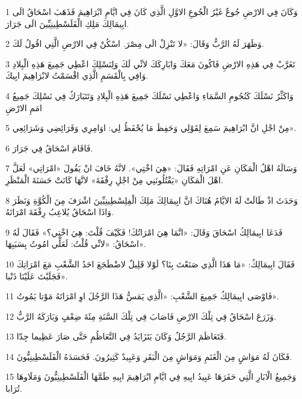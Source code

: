 \par 1 وَكَانَ فِي الارْضِ جُوعٌ غَيْرُ الْجُوعِ الاوَّلِ الَّذِي كَانَ فِي ايَّامِ ابْرَاهِيمَ فَذَهَبَ اسْحَاقُ الَى ابِيمَالِكَ مَلِكِ الْفَلَسْطِينِيِّينَ الَى جَرَارَ.
\par 2 وَظَهَرَ لَهُ الرَّبُّ وَقَالَ: «لا تَنْزِلْ الَى مِصْرَ. اسْكُنْ فِي الارْضِ الَّتِي اقُولُ لَكَ.
\par 3 تَغَرَّبْ فِي هَذِهِ الارْضِ فَاكُونَ مَعَكَ وَابَارِكَكَ لانِّي لَكَ وَلِنَسْلِكَ اعْطِي جَمِيعَ هَذِهِ الْبِلادِ وَافِي بِالْقَسَمِ الَّذِي اقْسَمْتُ لابْرَاهِيمَ ابِيكَ.
\par 4 وَاكَثِّرُ نَسْلَكَ كَنُجُومِ السَّمَاءِ وَاعْطِي نَسْلَكَ جَمِيعَ هَذِهِ الْبِلادِ وَتَتَبَارَكُ فِي نَسْلِكَ جَمِيعُ امَمِ الارْضِ
\par 5 مِنْ اجْلِ انَّ ابْرَاهِيمَ سَمِعَ لِقَوْلِي وَحَفِظَ مَا يُحْفَظُ لِي: اوَامِرِي وَفَرَائِضِي وَشَرَائِعِي».
\par 6 فَاقَامَ اسْحَاقُ فِي جَرَارَ.
\par 7 وَسَالَهُ اهْلُ الْمَكَانِ عَنِ امْرَاتِهِ فَقَالَ: «هِيَ اخْتِي». لانَّهُ خَافَ انْ يَقُولَ «امْرَاتِي» لَعَلَّ اهْلَ الْمَكَانِ «يَقْتُلُونَنِي مِنْ اجْلِ رِفْقَةَ» لانَّهَا كَانَتْ حَسَنَةَ الْمَنْظَرِ.
\par 8 وَحَدَثَ اذْ طَالَتْ لَهُ الايَّامُ هُنَاكَ انَّ ابِيمَالِكَ مَلِكَ الْفِلِسْطِينِيِّينَ اشْرَفَ مِنَ الْكُوَّةِ وَنَظَرَ وَاذَا اسْحَاقُ يُلاعِبُ رِفْقَةَ امْرَاتَهُ.
\par 9 فَدَعَا ابِيمَالِكُ اسْحَاقَ وَقَالَ: «انَّمَا هِيَ امْرَاتُكَ! فَكَيْفَ قُلْتَ: هِيَ اخْتِي؟» فَقَالَ لَهُ اسْحَاقُ: «لانِّي قُلْتُ: لَعَلِّي امُوتُ بِسَبَبِهَا».
\par 10 فَقَالَ ابِيمَالِكُ: «مَا هَذَا الَّذِي صَنَعْتَ بِنَا؟ لَوْلا قَلِيلٌ لاضْطَجَعَ احَدُ الشَّعْبِ مَعَ امْرَاتِكَ فَجَلَبْتَ عَلَيْنَا ذَنْبا».
\par 11 فَاوْصَى ابِيمَالِكُ جَمِيعَ الشَّعْبِ: «الَّذِي يَمَسُّ هَذَا الرَّجُلَ اوِ امْرَاتَهُ مَوْتا يَمُوتُ».
\par 12 وَزَرَعَ اسْحَاقُ فِي تِلْكَ الارْضِ فَاصَابَ فِي تِلْكَ السَّنَةِ مِئَةَ ضِعْفٍ وَبَارَكَهُ الرَّبُّ.
\par 13 فَتَعَاظَمَ الرَّجُلُ وَكَانَ يَتَزَايَدُ فِي التَّعَاظُمِ حَتَّى صَارَ عَظِيما جِدّا.
\par 14 فَكَانَ لَهُ مَوَاشٍ مِنَ الْغَنَمِ وَمَوَاشٍ مِنَ الْبَقَرِ وَعَبِيدٌ كَثِيرُونَ. فَحَسَدَهُ الْفَلَسْطِينِيُّونَ.
\par 15 وَجَمِيعُ الْابَارِ الَّتِي حَفَرَهَا عَبِيدُ ابِيهِ فِي ايَّامِ ابْرَاهِيمَ ابِيهِ طَمَّهَا الْفَلَسْطِينِيُّونَ وَمَلَاوهَا تُرَابا.
